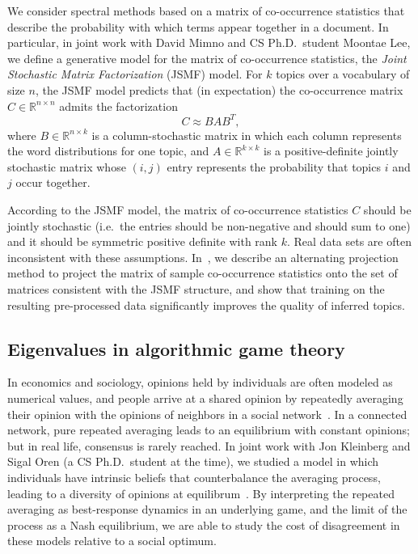 \documentclass[11pt]{amsart}
\newcommand{\bbR}{\mathbb{R}}
\begin{document}
We consider spectral methods
based on a matrix of co-occurrence statistics that
describe the probability with which terms appear together in a document.
In particular, in joint work with David Mimno and CS Ph.D.~student
Moontae Lee, we define a generative model for the matrix of
co-occurrence statistics, the {\em Joint Stochastic Matrix
Factorization} (JSMF) model.  For $k$ topics over a vocabulary of size $n$,
the JSMF model predicts that (in expectation) the
co-occurrence matrix $C\in \bbR^{n \times n}$ admits the
factorization
\[
  C \approx B A B^T,
\]
where $B \in \bbR^{n \times k}$ is
a column-stochastic matrix in which each column represents the word
distributions for one topic, and $A \in \bbR^{k \times k}$ is a
positive-definite jointly stochastic matrix whose $(i,j)$ entry
represents the probability that topics $i$ and $j$ occur together.

According to the JSMF model, the matrix of co-occurrence statistics $C$
should be jointly stochastic (i.e.~the entries should be non-negative
and should sum to one) and it should be symmetric positive definite with
rank $k$.  Real data sets are often inconsistent with these assumptions.
In~\cite{2015-nips}, we describe an alternating projection method to
project the matrix of sample co-occurrence statistics onto the set of
matrices consistent with the JSMF structure, and show that training on
the resulting pre-processed data significantly improves the quality of
inferred topics.

\subsection*{Eigenvalues in algorithmic game theory}

In economics and sociology, opinions held by individuals are often
modeled as numerical values, and people arrive at a shared opinion by
repeatedly averaging their opinion with the opinions of neighbors in a
social network~\cite{Degroot:1974:Opinions}.  In a connected network, pure repeated averaging leads
to an equilibrium with constant opinions; but in
real life, consensus is rarely reached. In joint work with Jon
Kleinberg and Sigal Oren (a CS Ph.D.~student at the time),
we studied a model in which individuals have intrinsic beliefs
that counterbalance the averaging process, leading to a diversity
of opinions at equilibrum~\cite{2011-focs,2015-geb}.
By interpreting the repeated averaging as best-response dynamics in an
underlying game, and the limit of the process as a Nash
equilibrium, we are able to study the cost of disagreement in these
models relative to a social optimum.
\end{document}
